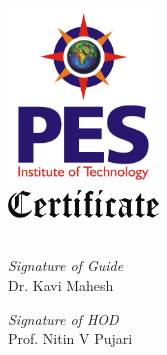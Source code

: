 \begin{center}

\vspace{15in}

\includegraphics[width=0.3\textwidth]{./logo}\\[2cm]    
\includegraphics[width=0.3\textwidth]{./certificate-text.png}\\[2cm]
\normalfont
{}\\[4cm]
\begin{minipage}{0.4\textwidth}
\begin{flushleft} \large
\emph{Signature of Guide}\\
Dr. Kavi Mahesh
\end{flushleft}
\end{minipage}
\begin{minipage}{0.4\textwidth}
\begin{flushright} \large
\emph{Signature of HOD} \\
Prof. Nitin V Pujari 
\end{flushright}
\end{minipage}
\end{center}
